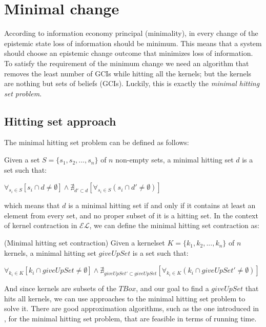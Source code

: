 \section{Minimal change}
According to information economy principal (minimality), in every change of the epistemic state loss of information should be minimum\cite{econ}. This means that a system should choose an epistemic change outcome that minimizes loss of information. To satisfy the requirement of the minimum change we need an algorithm that removes the least number of GCIs while hitting all the kernels; but the kernels are nothing but sets of beliefs (GCIs). Luckily, this is exactly the \textit{minimal hitting set problem}. 

\subsection{Hitting set approach}
The minimal hitting set problem can be defined as follows:
\begin{defn}
Given a set $S=\{s_{1}, s_{2}, ..., s_{n}\}$ of $n$ non-empty sets, a minimal hitting set $d$ is a set such that:
\begin{center}
$\forall_{s_{i} \in S} [ s_{i} \cap d \neq \emptyset] \wedge \nexists_{d' \subset d}[\forall_{s_{i} \in S} (s_{i} \cap d' \neq \emptyset) ]$\cite{hit}
\end{center}
\end{defn}

which means that $d$ is a minimal hitting set if and only if it contains at least an element from every set, and no proper subset of it is a hitting set. In the context of kernel contraction in $\mathcal{EL}$, we can define the minimal hitting set contraction as:
\begin{defn}(Minimal hitting set contraction)
Given a kernelset $K=\{k_{1}, k_{2}, ..., k_{n}\}$ of $n$ kernels, a minimal hitting set $giveUpSet$ is a set such that:
\begin{center}
$\forall_{k_{i} \in K} [ k_{i} \cap giveUpSet \neq \emptyset] \wedge \nexists_{giveUpSet' \subset giveUpSet}[\forall_{k_{i} \in K} (k_{i} \cap giveUpSet' \neq \emptyset) ]$
\end{center}
\end{defn}

And since kernels are subsets of the $TBox$, and our goal to find a $giveUpSet$ that hits all kernels, we can use approaches to the minimal hitting set problem to solve it. There are good approximation algorithms, such as the one introduced in \cite{hit}, for the minimal hitting set problem, that are feasible in terms of running time. 

